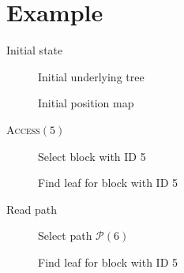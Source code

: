 

\section{Example}

	\begin{frame}{Initial state}

		\begin{figure}
			\centering

			
			\caption{Initial underlying tree}
		\end{figure}

		\vspace{-12pt}

		\begin{figure}
			\centering

			
			\caption{Initial position map}
		\end{figure}	
		
	\end{frame}

	\begin{frame}{\textsc{Access}$(5)$}
		
		\selectedtrue

		\begin{figure}
			\centering

			
			\caption{Select block with ID 5}
		\end{figure}		

		\vspace{-12pt}

		\begin{figure}
			\centering

			
			\caption{Find leaf for block with ID 5}
		\end{figure}	
		
	\end{frame}

	\begin{frame}{Read path}
		
		\selectedtrue
		\pathreadtrue

		\begin{figure}
			\centering

			
			\caption{Select path $\mathcal{P}(6)$}
		\end{figure}		

		\vspace{-12pt}

		\begin{figure}
			\centering

			
			\caption{Find leaf for block with ID 5}
		\end{figure}	
		
	\end{frame}

